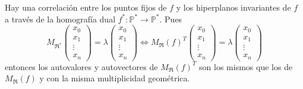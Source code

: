 \begin{observación}
    Hay una correlación entre los puntos fijos de $f$ y los hiperplanos invariantes de $f$ a través de la homografía dual $f^* : \mathbb{P}^* \to \mathbb{P}^*$. Pues
    \[
        M_{\mathfrak{R}^*}\begin{pmatrix}
            x_0 \\ x_1 \\ \vdots \\ x_n
        \end{pmatrix} = \lambda \begin{pmatrix}
            x_0 \\ x_1 \\ \vdots \\ x_n
        \end{pmatrix} \iff M_{\mathfrak{R}}(f)^T \begin{pmatrix}
            x_0 \\ x_1 \\ \vdots \\ x_n
        \end{pmatrix} = \lambda \begin{pmatrix}
            x_0 \\ x_1 \\ \vdots \\ x_n
        \end{pmatrix}
    \]
    entonces los autovalores y autovectores de $M_{\mathfrak{R}}(f)^T$ son los mismos que los de $M_{\mathfrak{R}}(f)$ y con la misma multiplicidad geométrica.
\end{observación}

